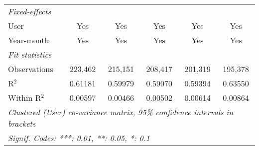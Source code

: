 \begin{table}[htbp]
\begin{threeparttable}[b]
\begin{tabular}{lccccc}
         \emph{Fixed-effects}\\
         User                         & Yes              & Yes              & Yes              & Yes              & Yes\\  
         Year-month                   & Yes              & Yes              & Yes              & Yes              & Yes\\  
         \midrule
         \emph{Fit statistics}\\
         Observations                 & 223,462          & 215,151          & 208,417          & 201,319          & 195,378\\  
         R$^2$                        & 0.61181          & 0.59979          & 0.59070          & 0.59394          & 0.63550\\  
         Within R$^2$                 & 0.00597          & 0.00466          & 0.00502          & 0.00614          & 0.00864\\  
         \midrule \midrule
         \multicolumn{6}{l}{\emph{Clustered (User) co-variance matrix, 95\% confidence intervals in brackets}}\\
         \multicolumn{6}{l}{\emph{Signif. Codes: ***: 0.01, **: 0.05, *: 0.1}}\\
      \end{tabular}
   \end{threeparttable}
\end{table}


